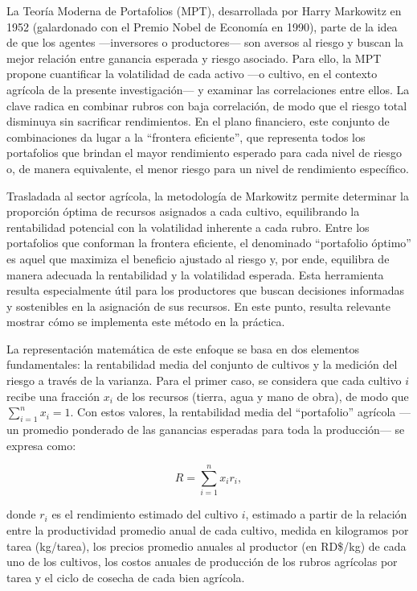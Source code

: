 \documentclass[
  letterpaper,
  DIV=11,
  numbers=noendperiod]{scrartcl}
\begin{document}
La Teoría Moderna de Portafolios (MPT), desarrollada por Harry Markowitz
en 1952 (galardonado con el Premio Nobel de Economía en 1990), parte de
la idea de que los agentes ---inversores o productores--- son aversos al
riesgo y buscan la mejor relación entre ganancia esperada y riesgo
asociado. Para ello, la MPT propone cuantificar la volatilidad de cada
activo ---o cultivo, en el contexto agrícola de la presente
investigación--- y examinar las correlaciones entre ellos. La clave
radica en combinar rubros con baja correlación, de modo que el riesgo
total disminuya sin sacrificar rendimientos. En el plano financiero,
este conjunto de combinaciones da lugar a la ``frontera eficiente'', que
representa todos los portafolios que brindan el mayor rendimiento
esperado para cada nivel de riesgo o, de manera equivalente, el menor
riesgo para un nivel de rendimiento específico.

Trasladada al sector agrícola, la metodología de Markowitz permite
determinar la proporción óptima de recursos asignados a cada cultivo,
equilibrando la rentabilidad potencial con la volatilidad inherente a
cada rubro. Entre los portafolios que conforman la frontera eficiente,
el denominado ``portafolio óptimo'' es aquel que maximiza el beneficio
ajustado al riesgo y, por ende, equilibra de manera adecuada la
rentabilidad y la volatilidad esperada. Esta herramienta resulta
especialmente útil para los productores que buscan decisiones informadas
y sostenibles en la asignación de sus recursos. En este punto, resulta
relevante mostrar cómo se implementa este método en la práctica.

La representación matemática de este enfoque se basa en dos elementos
fundamentales: la rentabilidad media del conjunto de cultivos y la
medición del riesgo a través de la varianza. Para el primer caso, se
considera que cada cultivo \(i\) recibe una fracción \(x_i\) de los
recursos (tierra, agua y mano de obra), de modo que
\(\sum_{i=1}^n x_i = 1\). Con estos valores, la rentabilidad media del
``portafolio'' agrícola ---un promedio ponderado de las ganancias
esperadas para toda la producción--- se expresa como:

\[
R = \sum_{i=1}^n x_i r_i,
\]

donde \(r_i\) es el rendimiento estimado del cultivo \(i\), estimado a
partir de la relación entre la productividad promedio anual de cada
cultivo, medida en kilogramos por tarea (kg/tarea), los precios promedio
anuales al productor (en RD\$/kg) de cada uno de los cultivos, los
costos anuales de producción de los rubros agrícolas por tarea y el
ciclo de cosecha de cada bien agrícola.
\end{document}
